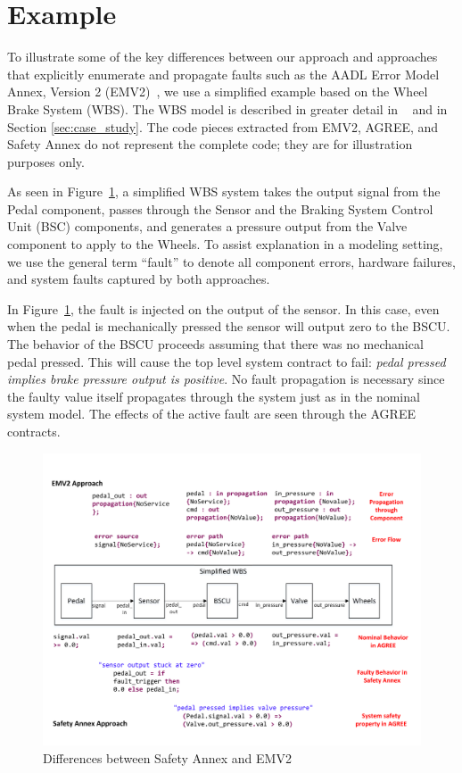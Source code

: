 \section{Example}
\label{sec:comparison_with_EMV2}

To illustrate some of the key differences between our approach and approaches that explicitly enumerate and propagate faults such as the AADL Error Model Annex, Version 2 (EMV2)~\cite{EMV2}, we use a simplified example based on the Wheel Brake System (WBS). The WBS model is described in greater detail in ~\cite{Stewart17:IMBSA} and in Section \ref{sec:case_study}. The code pieces extracted from EMV2, AGREE, and Safety Annex do not represent the complete code; they are for illustration purposes only.

As seen in Figure~\ref{fig:comparison_with_EMV2}, a simplified WBS system takes the output signal from the Pedal component, passes through the Sensor and the Braking System Control Unit (BSC) components, and generates a pressure output from the Valve component to apply to the Wheels. To assist explanation in a modeling setting, we use the general term ``fault'' to denote all component errors, hardware failures, and system faults captured by both approaches.

In Figure~\ref{fig:comparison_with_EMV2}, the fault is injected on the output of the sensor. In this case, even when the pedal is mechanically pressed the sensor will output zero to the BSCU. The behavior of the BSCU proceeds assuming that there was no mechanical pedal pressed. This will cause the top level system contract to fail: {\em pedal pressed implies brake pressure output is positive}. No fault propagation is necessary since the faulty value itself propagates through the system just as in the nominal system model. The effects of the active fault are seen through the AGREE contracts. 

\begin{figure}[h!]
	\vspace{-0.19in}
	\centering
	\includegraphics[trim=0 9 0 5,clip,width=\textwidth]{images/Comparison_with_EMV2.pdf}
	\caption{Differences between Safety Annex and EMV2}
	\label{fig:comparison_with_EMV2}
\end{figure} 
 
